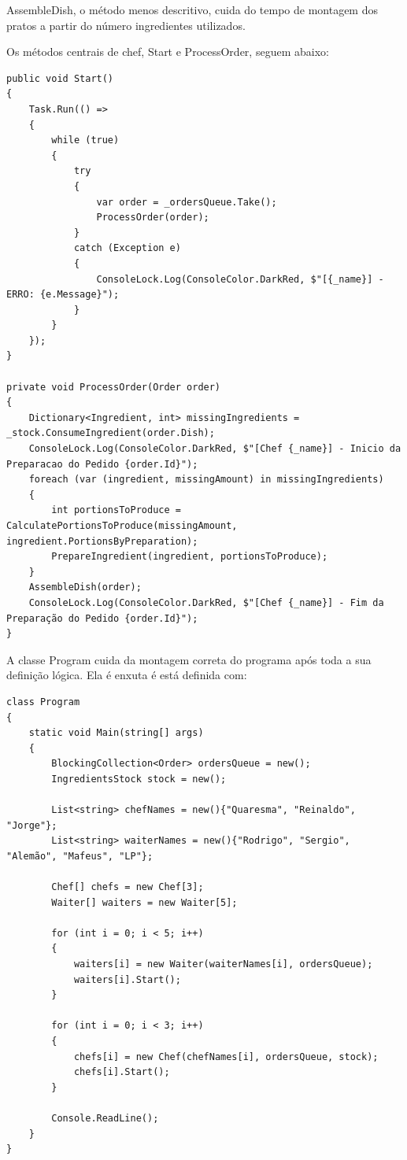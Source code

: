 \documentclass[
	12pt,				%
	oneside,			%
	a4paper,			%
	english,			%
	brazil,				%
	]{abntex2}
\begin{document}
{AssembleDish, o método menos descritivo, cuida do tempo de montagem dos pratos a partir do número ingredientes utilizados.

Os métodos centrais de chef, Start e ProcessOrder, seguem abaixo:
\begin{lstlisting}
public void Start()
{
    Task.Run(() =>
    {
        while (true)
        {
            try
            {
                var order = _ordersQueue.Take();
                ProcessOrder(order);
            }
            catch (Exception e)
            {
                ConsoleLock.Log(ConsoleColor.DarkRed, $"[{_name}] - ERRO: {e.Message}");
            }
        }
    });
}

private void ProcessOrder(Order order)
{
    Dictionary<Ingredient, int> missingIngredients = _stock.ConsumeIngredient(order.Dish);
    ConsoleLock.Log(ConsoleColor.DarkRed, $"[Chef {_name}] - Inicio da Preparacao do Pedido {order.Id}");
    foreach (var (ingredient, missingAmount) in missingIngredients)
    {
        int portionsToProduce = CalculatePortionsToProduce(missingAmount, ingredient.PortionsByPreparation);
        PrepareIngredient(ingredient, portionsToProduce);
    }
    AssembleDish(order);
    ConsoleLock.Log(ConsoleColor.DarkRed, $"[Chef {_name}] - Fim da Preparação do Pedido {order.Id}");
}
\end{lstlisting}

A classe Program cuida da montagem correta do programa após toda a sua definição lógica. Ela é enxuta é está definida com:
\begin{lstlisting}
class Program
{
    static void Main(string[] args)
    {
        BlockingCollection<Order> ordersQueue = new();
        IngredientsStock stock = new();
        
        List<string> chefNames = new(){"Quaresma", "Reinaldo", "Jorge"};
        List<string> waiterNames = new(){"Rodrigo", "Sergio", "Alemão", "Mafeus", "LP"};

        Chef[] chefs = new Chef[3];
        Waiter[] waiters = new Waiter[5];

        for (int i = 0; i < 5; i++)
        {
            waiters[i] = new Waiter(waiterNames[i], ordersQueue);
            waiters[i].Start();
        }

        for (int i = 0; i < 3; i++)
        {
            chefs[i] = new Chef(chefNames[i], ordersQueue, stock);
            chefs[i].Start();
        }

        Console.ReadLine();
    }
}
\end{lstlisting}

}
\end{document}
